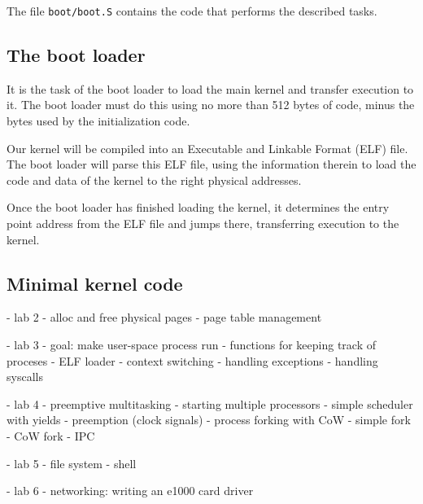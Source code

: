 \documentclass{article}
\begin{document}
The file \texttt{boot/boot.S} contains the code that performs the described
tasks.



\subsection{The boot loader}
It is the task of the boot loader to load the main kernel and transfer
execution to it. The boot loader must do this using no more than 512 bytes of
code, minus the bytes used by the initialization code.

Our kernel will be compiled into an Executable and Linkable Format (ELF) file.
The boot loader will parse this ELF file, using the information therein to
load the code and data of the kernel to the right physical addresses.


Once the boot loader has finished loading the kernel, it determines the entry
point address from the ELF file and jumps there, transferring execution to the
kernel.

\subsection{Minimal kernel code}











- lab 2
	- alloc and free physical pages
	- page table management



- lab 3
	- goal: make user-space process run
	- functions for keeping track of proceses
	- ELF loader
	- context switching
	- handling exceptions
	- handling syscalls


- lab 4
	- preemptive multitasking
		- starting multiple processors
		- simple scheduler with yields
		- preemption (clock signals)
	- process forking with CoW
		- simple fork
		- CoW fork
	- IPC


- lab 5
	- file system
	- shell


- lab 6
	- networking: writing an e1000 card driver
\end{document}

